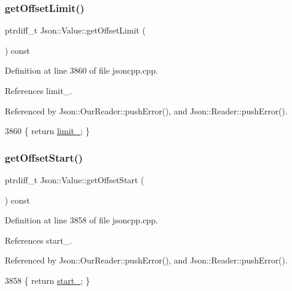 \subsubsection{\texorpdfstring{get\+Offset\+Limit()}{getOffsetLimit()}}
{\footnotesize\ttfamily ptrdiff\+\_\+t Json\+::\+Value\+::get\+Offset\+Limit (\begin{DoxyParamCaption}{ }\end{DoxyParamCaption}) const}



Definition at line 3860 of file jsoncpp.\+cpp.



References limit\+\_\+.



Referenced by Json\+::\+Our\+Reader\+::push\+Error(), and Json\+::\+Reader\+::push\+Error().


\begin{DoxyCode}
3860 \{ \textcolor{keywordflow}{return} \hyperlink{class_json_1_1_value_afe377e25f6d3b5b8ea7221c84f29412a}{limit\_}; \}
\end{DoxyCode}
\mbox{\label{class_json_1_1_value_afa081dc764000951a1d8d6148155508e}} 
\subsubsection{\texorpdfstring{get\+Offset\+Start()}{getOffsetStart()}}
{\footnotesize\ttfamily ptrdiff\+\_\+t Json\+::\+Value\+::get\+Offset\+Start (\begin{DoxyParamCaption}{ }\end{DoxyParamCaption}) const}



Definition at line 3858 of file jsoncpp.\+cpp.



References start\+\_\+.



Referenced by Json\+::\+Our\+Reader\+::push\+Error(), and Json\+::\+Reader\+::push\+Error().


\begin{DoxyCode}
3858 \{ \textcolor{keywordflow}{return} \hyperlink{class_json_1_1_value_a1c3aeb0fa8fefe93776cb347c76a25a8}{start\_}; \}
\end{DoxyCode}
\mbox{\label{class_json_1_1_value_a2e1b7be6bde2fe23f15290d9ddbbdf8a}} 
